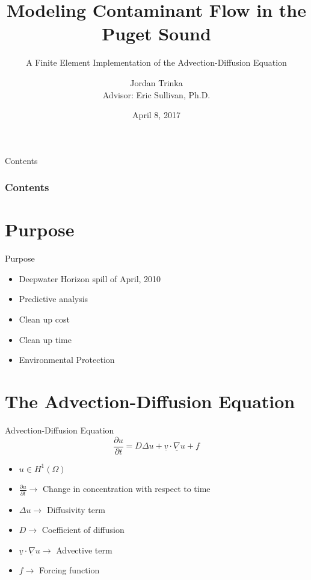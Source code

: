 \documentclass[10pt]{beamer}
\author{Jordan Trinka\\ Advisor: Eric Sullivan, Ph.D.}
\title[Short Title]{ Modeling Contaminant Flow in the \\Puget Sound}
\subtitle{A Finite Element Implementation of the Advection-Diffusion Equation} %
\date{April 8, 2017} %
\begin{document}
\begin{frame}[t,plain]
    \titlepage
\end{frame}

\begin{frame}{Contents}
\frametitle{Contents}
    \tableofcontents[
]
\end{frame}

\section{Purpose}

\begin{frame}{Purpose} \label{Purpose}
\begin{itemize}
\item Deepwater Horizon spill of April, 2010
\item Predictive analysis
\item Clean up cost
\item Clean up time
\item Environmental Protection
\end{itemize}
\hyperlink{Questions}{}
\end{frame}

\section{The Advection-Diffusion Equation} 
\begin{frame}{Advection-Diffusion Equation}\label{The Advection-Diffusion Equation}
\begin{equation}
\frac{\partial u}{\partial t}= D\Delta u + \underline{v} \cdot \underline{\nabla}u+f
\end{equation}
\begin{itemize}
\item $u \in  H^{1}\left(\Omega \right)$
\item $\frac{\partial u}{\partial t} \rightarrow$ Change in concentration with respect to time
\item $\Delta u \rightarrow$ Diffusivity term
\item $D \rightarrow$ Coefficient of diffusion
\item $\underline{v} \cdot \underline{\nabla}u \rightarrow$ Advective term
\item $f \rightarrow$ Forcing function 
\end{itemize}
\hyperlink{Questions}{}
\end{frame}
\end{document}
